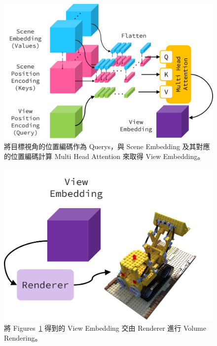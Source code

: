 \documentclass[10pt,twocolumn,letterpaper]{article}
\begin{document}
\begin{CJK}{UTF8}{bkai}
   \begin{figure}
      \begin{center}
         \includegraphics[width=1\linewidth]{img/view-embedding.png}
      \end{center}
      \caption{
         將目標視角的位置編碼作為 Querys，與 Scene Embedding 及其對應的位置編碼計算
         Multi Head Attention 來取得 View Embedding。
      }
      \label{fig:view-embedding}
   \end{figure}

   \begin{figure}[t]
      \begin{center}
         \includegraphics[width=1\linewidth]{img/render-view.png}
      \end{center}
      \caption{
         將 Figures~\ref{fig:view-embedding} 得到的 View Embedding 交由
         Renderer 進行 Volume Rendering。
      }
      \label{fig:render-view}
   \end{figure}

\end{CJK}
\end{document}
